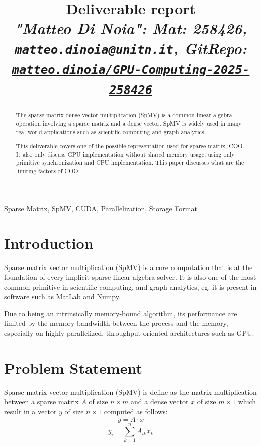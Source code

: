 \documentclass[conference]{IEEEtran}
\newcommand{\torem}[1]{\color{olive} #1 \color{black}}
\begin{document}
\title{Deliverable report \\
\footnotesize \textit{"Matteo Di Noia": Mat: 258426, \texttt{matteo.dinoia@unitn.it}, GitRepo: \texttt{\href{https://github.com/matteo-dinoia/GPU-Computing-2025-258426}{matteo.dinoia/GPU-Computing-2025-258426}}}}

\maketitle

\begin{abstract}
The sparse matrix-dense vector multiplication (SpMV) is a common linear algebra operation involving a sparse matrix and a dense vector. SpMV is widely used in many real-world applications such as scientific computing and graph analytics.

This deliverable covers one of the possible representation used for sparse matrix, COO. It also only discuss GPU implementation without shared memory usage, using only primitive synchronization and CPU implementation. This paper discusses what are the limiting factors of COO.
\end{abstract}

\begin{IEEEkeywords}
Sparse Matrix, SpMV, CUDA, Parallelization, Storage Format
\end{IEEEkeywords}

\section{Introduction}

Sparse matrix vector multiplication (SpMV) is a core computation that is at the foundation of every implicit sparse linear algebra solver. It is also one of the most common primitive in scientific computing, and graph analytics, eg. it is present in software such as MatLab and Numpy.

Due to being an intrinsically memory-bound algorithm, its performance are limited by the memory bandwidth between the process and the memory, especially on highly parallelized, throughput-oriented architectures such as GPU.


\section{Problem Statement}
Sparse matrix vector multiplication (SpMV) is define as the matrix multiplication between a sparse matrix $A$ of size $n\times m$ and a dense vector $x$ of size $m\times 1$ which result in a vector $y$ of size $n\times 1$ computed as follows:
\[y=A \cdot x\]
\[y_i = \sum_{k=1}^{n}A_{ik} x_{k}\]
\end{document}

